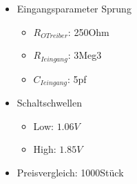 \begin{frame}[c]{}
    

  \begin{itemize}
    \item Eingangsparameter Sprung
      \begin{itemize}
        \item $R_{OTreiber}$: 250Ohm
        \item $R_{Ieingang}$: 3Meg3
        \item $C_{Ieingang}$: 5pf
      \end{itemize}
    \item Schaltschwellen
      \begin{itemize}
        \item Low: $1.06V$
        \item High: $1.85V$
      \end{itemize}
    \item Preisvergleich: 1000Stück
  \end{itemize}
    
\end{frame}

